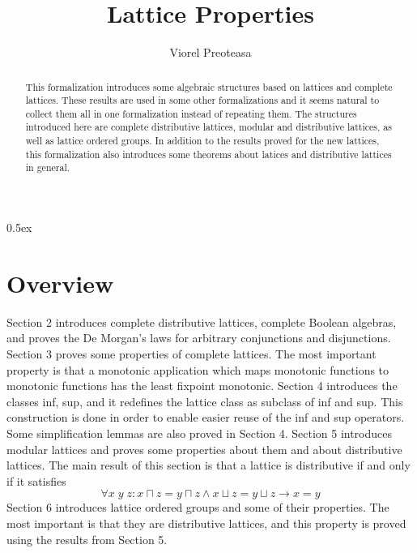 \documentclass[11pt,a4paper]{article}
\begin{document}
\title{Lattice Properties}

\author{Viorel Preoteasa}

\maketitle

\begin{abstract}
This formalization introduces some algebraic structures
based on lattices and complete lattices. These results 
are used in some other formalizations and it seems natural
to collect them all in one formalization instead of
repeating them. The structures introduced here are
complete distributive lattices, modular and distributive
lattices, as well as lattice ordered groups. In addition 
to the results proved for the new lattices, this
formalization also introduces some theorems
about latices and distributive lattices in general.
\end{abstract}

\tableofcontents

\parindent 0pt\parskip 0.5ex

\section{Overview}

Section 2 introduces complete distributive lattices, complete
Boolean algebras, and proves the De Morgan's laws for arbitrary
conjunctions and disjunctions. Section 3 proves some properties
of complete lattices. The most important property is that 
a monotonic application which maps monotonic functions to
monotonic functions has the least fixpoint monotonic.
Section 4 introduces the classes inf, sup, and it redefines
the lattice class as subclass of inf and sup. This construction
is done in order to enable easier reuse of the inf and sup
operators. Some simplification lemmas are also proved in 
Section 4.
Section 5 introduces modular lattices and proves some properties
about them and about distributive lattices. The main result
of this section is that a lattice is distributive if and only
if it satisfies
$$\forall x \; y \; z: x \sqcap z = y \sqcap z \land  x \sqcup z = y \sqcup z \longrightarrow x = y$$
Section 6 introduces lattice ordered groups and some of their properties.
The most important is that they are distributive lattices, and
this property is proved using the results from Section 5.





\end{document}
